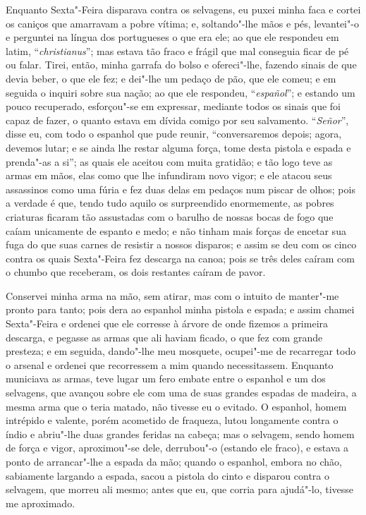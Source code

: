 Enquanto Sexta"-Feira disparava contra os selvagens, eu puxei minha faca
e cortei os caniços que amarravam a pobre vítima; e, soltando"-lhe mãos e
pés, levantei"-o e perguntei na língua dos portugueses o que era ele; ao
que ele respondeu em latim, ``\emph{christianus}''; mas estava tão fraco
e frágil que mal conseguia ficar de pé ou falar. Tirei, então, minha
garrafa do bolso e ofereci"-lhe, fazendo sinais de que devia beber, o que
ele fez; e dei"-lhe um pedaço de pão, que ele comeu; e em seguida o
inquiri sobre sua nação; ao que ele respondeu, ``\emph{español}''; e
estando um pouco recuperado, esforçou"-se em expressar, mediante todos os
sinais que foi capaz de fazer, o quanto estava em dívida comigo por seu
salvamento. ``\emph{Señor}'', disse eu, com todo o espanhol que pude
reunir, ``conversaremos depois; agora, devemos lutar; e se ainda lhe
restar alguma força, tome desta pistola e espada e prenda"-as a si''; as
quais ele aceitou com muita gratidão; e tão logo teve as armas em mãos,
elas como que lhe infundiram novo vigor; e ele atacou seus assassinos
como uma fúria e fez duas delas em pedaços num piscar de olhos; pois a
verdade é que, tendo tudo aquilo os surpreendido enormemente, as pobres
criaturas ficaram tão assustadas com o barulho de nossas bocas de fogo
que caíam unicamente de espanto e medo; e não tinham mais forças de
encetar sua fuga do que suas carnes de resistir a nossos disparos; e
assim se deu com os cinco contra os quais Sexta"-Feira fez descarga na
canoa; pois se três deles caíram com o chumbo que receberam, os dois
restantes caíram de pavor.

Conservei minha arma na mão, sem atirar, mas com o intuito de manter"-me
pronto para tanto; pois dera ao espanhol minha pistola e espada; e assim
chamei Sexta"-Feira e ordenei que ele corresse à árvore de onde fizemos a
primeira descarga, e pegasse as armas que ali haviam ficado, o que fez
com grande presteza; e em seguida, dando"-lhe meu mosquete, ocupei"-me de
recarregar todo o arsenal e ordenei que recorressem a mim quando
necessitassem. Enquanto municiava as armas, teve lugar um fero embate
entre o espanhol e um dos selvagens, que avançou sobre ele com uma de
suas grandes espadas de madeira, a mesma arma que o teria matado, não
tivesse eu o evitado. O espanhol, homem intrépido e valente, porém
acometido de fraqueza, lutou longamente contra o índio e abriu"-lhe duas
grandes feridas na cabeça; mas o selvagem, sendo homem de força e vigor,
aproximou"-se dele, derrubou"-o (estando ele fraco), e estava a ponto de
arrancar"-lhe a espada da mão; quando o espanhol, embora no chão,
sabiamente largando a espada, sacou a pistola do cinto e disparou contra
o selvagem, que morreu ali mesmo; antes que eu, que corria para
ajudá"-lo, tivesse me aproximado.

